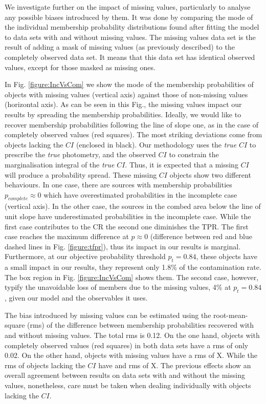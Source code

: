 We investigate further on the impact of missing values, particularly to analyse any possible biases introduced by them. It was done by comparing the mode of the individual membership probability distributions found after fitting the model to data sets with and without missing values. The missing values data set is the result of adding a mask of missing values (as previously described) to the completely observed data set. It means that this data set has identical observed values, except for those masked as missing ones. 

In Fig. \ref{figure:IncVsCom} we show the mode of the membership probabilities of objects with missing values (vertical axis) against those of non-missing values (horizontal axis). As can be seen in this Fig., the missing values impact our results by spreading the membership probabilities. Ideally, we would like to recover membership probabilities following the line of slope one, as in the case of completely observed values (red squares). The most striking deviations come from objects lacking the $CI$ (enclosed in black). Our methodology uses the \emph{true} $CI$ to prescribe the \emph{true} photometry, and the observed $CI$ to constrain the marginalisation integral of the \emph{true} $CI$. Thus, it is expected that a missing $CI$ will produce a probability spread. These missing $CI$ objects show two different behaviours. In one case, there are sources with membership probabilities $p_{complete} \approx0$ which have overestimated probabilities in the incomplete case (vertical axis). In the other case, the sources in the combed area below the line of unit slope have underestimated probabilities in the incomplete case. While the first case contributes to the CR the second one diminishes the TPR. The first case reaches the maximum difference at $p \approx 0$ (difference between red and blue dashed lines in Fig. \ref{figure:tfpr}), thus its impact in our results is marginal. Furthermore, at our objective probability threshold $p_t=0.84$, these objects have a small impact in our results, they represent only 1.8\% of the contamination rate. The box region in Fig. \ref{figure:IncVsCom} shows them. The second case, however, typify the unavoidable loss of members due to the missing values, 4\% at $p_t=0.84$, given our model and the observables it uses.


The bias introduced by missing values can be estimated using the root-mean-square (rms) of the difference between membership probabilities recovered with and without missing values. The total rms is 0.12. On the one hand, objects with completely observed values (red squares) in both data sets have a rms of only 0.02. On the other hand, objects with missing values have a rms of X. While the rms of objects lacking the $CI$ have and rms of X.  The previous effects show an overall agreement between results on data sets with and without the missing values, nonetheless, care must be taken when dealing individually with objects lacking the $CI$. 


